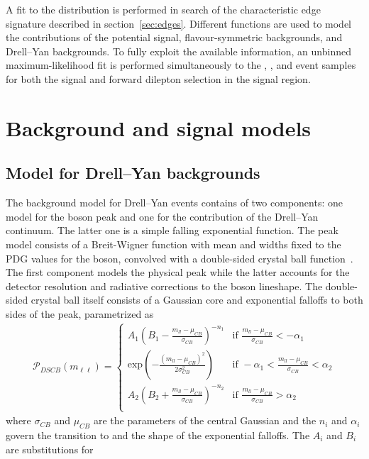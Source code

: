 \label{sec:fit}
A fit to the \mll distribution is performed in search of the characteristic edge signature described in section~\ref{sec:edges}. Different functions are used to model the contributions of the potential signal, flavour-symmetric backgrounds, and Drell--Yan backgrounds. To fully exploit the available information, an unbinned maximum-likelihood fit is performed simultaneously to the \EE, \MM, and \EM event samples for both the signal and forward dilepton selection in the signal region.

\section{Background and signal models}



\subsection{Model for Drell--Yan backgrounds}
\label{sec:Zmodel}
The background model for Drell--Yan events contains of two components: one model for the \Z boson peak and one for the contribution of the Drell--Yan continuum. The latter one is a simple falling exponential function. The peak model consists of a Breit-Wigner function with mean and widths fixed to the PDG values for the \Z boson, convolved with a double-sided crystal ball function~\cite{Crystal}. The first component models the physical peak while the latter accounts for the detector resolution and radiative corrections to the \Z boson lineshape. The double-sided crystal ball itself consists of a Gaussian core and exponential falloffs to both sides of the peak, parametrized as
\begin{eqnarray*}
\mathcal{P}_{DSCB}(m_{\ell\ell}) = \begin{cases} A_{1} (B_{1}-\frac{m_{ll}-\mu_{CB}}{\sigma_{CB}})^{-n_{1}} &\mbox{if } \frac{m_{ll}-\mu_{CB}}{\sigma_{CB}}<-\alpha_{1} \\
\textrm{exp}\left(-\frac{(m_{ll}-\mu_{CB})^2}{2\sigma_{CB}^2}\right) &\mbox{if } -\alpha_{1}<\frac{m_{ll}-\mu_{CB}}{\sigma_{CB}}<\alpha_{2} \\
A_{2} (B_{2}+\frac{m_{ll}-\mu_{CB}}{\sigma_{CB}})^{-n_{2}} &\mbox{if } \frac{m_{ll}-\mu_{CB}}{\sigma_{CB}}>\alpha_{2} \\
\end{cases}
\end{eqnarray*}
where $\sigma_{CB}$ and $\mu_{CB}$ are the parameters of the central Gaussian and the $n_i$ and $\alpha_i$ govern the transition to and the shape of the exponential falloffs. The $A_i$ and $B_i$ are substitutions for
